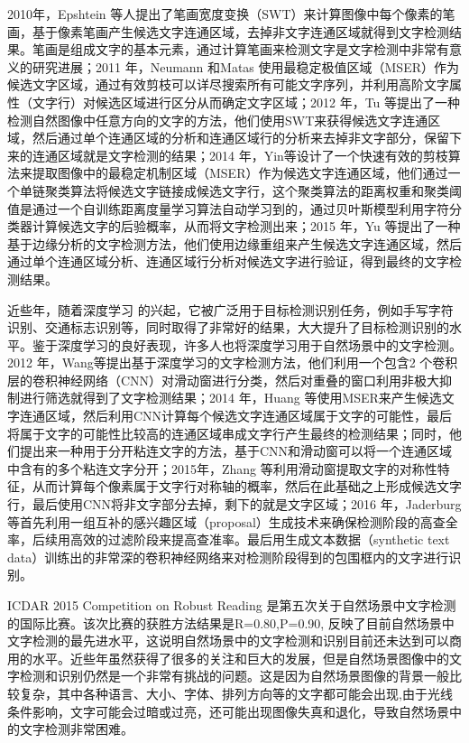     2010年，Epshtein\cite{Epshtein2010Detecting} 等人提出了笔画宽度变换（SWT）来计算图像中每个像素的笔画，基于像素笔画产生候选文字连通区域，去掉非文字连通区域就得到文字检测结果。笔画是组成文字的基本元素，通过计算笔画来检测文字是文字检测中非常有意义的研究进展；2011 年，Neumann 和Matas\cite{Neumann2011Text} 使用最稳定极值区域（MSER）作为候选文字区域，通过有效剪枝可以详尽搜索所有可能文字序列，并利用高阶文字属性（文字行）对候选区域进行区分从而确定文字区域；2012 年，Tu\cite{Tu2012Detecting} 等提出了一种检测自然图像中任意方向的文字的方法，他们使用SWT来获得候选文字连通区域，然后通过单个连通区域的分析和连通区域行的分析来去掉非文字部分，保留下来的连通区域就是文字检测的结果；2014 年，Yin\cite{Yin2013Robust}等设计了一个快速有效的剪枝算法来提取图像中的最稳定机制区域（MSER）作为候选文字连通区域，他们通过一个单链聚类算法将候选文字链接成候选文字行，这个聚类算法的距离权重和聚类阈值是通过一个自训练距离度量学习算法自动学习到的，通过贝叶斯模型利用字符分类器计算候选文字的后验概率，从而将文字检测出来；2015 年，Yu\cite{Yu2015Text} 等提出了一种基于边缘分析的文字检测方法，他们使用边缘重组来产生候选文字连通区域，然后通过单个连通区域分析、连通区域行分析对候选文字进行验证，得到最终的文字检测结果。

    近些年，随着深度学习\cite{Moral2010Foundations} 的兴起，它被广泛用于目标检测识别任务，例如手写字符识别、交通标志识别等，同时取得了非常好的结果，大大提升了目标检测识别的水平。鉴于深度学习的良好表现，许多人也将深度学习用于自然场景中的文字检测。2012 年，Wang\cite{Wang2012End}等提出基于深度学习的文字检测方法，他们利用一个包含2 个卷积层的卷积神经网络（CNN）对滑动窗进行分类，然后对重叠的窗口利用非极大抑制进行筛选就得到了文字检测结果；2014 年，Huang\cite{Huang2014Robust} 等使用MSER来产生候选文字连通区域，然后利用CNN计算每个候选文字连通区域属于文字的可能性，最后将属于文字的可能性比较高的连通区域串成文字行产生最终的检测结果；同时，他们提出来一种用于分开粘连文字的方法，基于CNN和滑动窗可以将一个连通区域中含有的多个粘连文字分开；2015年，Zhang\cite{Zhang2015Symmetry} 等利用滑动窗提取文字的对称性特征，从而计算每个像素属于文字行对称轴的概率，然后在此基础之上形成候选文字行，最后使用CNN将非文字部分去掉，剩下的就是文字区域；2016 年，Jaderburg\cite{Jaderberg2016Reading} 等首先利用一组互补的感兴趣区域（proposal）生成技术来确保检测阶段的高查全率，后续用高效的过滤阶段来提高查准率。最后用生成文本数据（synthetic text data）训练出的非常深的卷积神经网络来对检测阶段得到的包围框内的文字进行识别。

    ICDAR 2015 Competition on Robust Reading 是第五次关于自然场景中文字检测的国际比赛。该次比赛的获胜方法结果是R=0.80,P=0.90, 反映了目前自然场景中文字检测的最先进水平，这说明自然场景中的文字检测和识别目前还未达到可以商用的水平。近些年虽然获得了很多的关注和巨大的发展，但是自然场景图像中的文字检测和识别仍然是一个非常有挑战的问题。这是因为自然场景图像的背景一般比较复杂，其中各种语言、大小、字体、排列方向等的文字都可能会出现,由于光线条件影响，文字可能会过暗或过亮，还可能出现图像失真和退化，导致自然场景中的文字检测非常困难。

